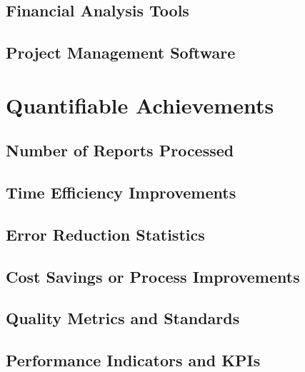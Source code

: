 \subsection{Financial Analysis Tools}

\subsection{Project Management Software}

\section{Quantifiable Achievements}

\subsection{Number of Reports Processed}

\subsection{Time Efficiency Improvements}

\subsection{Error Reduction Statistics}

\subsection{Cost Savings or Process Improvements}

\subsection{Quality Metrics and Standards}

\subsection{Performance Indicators and KPIs}

